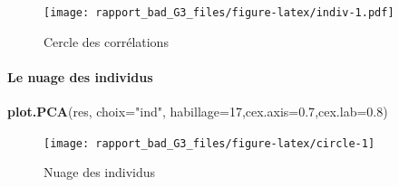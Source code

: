 \documentclass[
]{article}
\newenvironment{Shaded}{\begin{snugshade}}{\end{snugshade}}
\newcommand{\DataTypeTok}[1]{\textcolor[rgb]{0.13,0.29,0.53}{#1}}
\newcommand{\DecValTok}[1]{\textcolor[rgb]{0.00,0.00,0.81}{#1}}
\newcommand{\FloatTok}[1]{\textcolor[rgb]{0.00,0.00,0.81}{#1}}
\newcommand{\KeywordTok}[1]{\textcolor[rgb]{0.13,0.29,0.53}{\textbf{#1}}}
\newcommand{\NormalTok}[1]{#1}
\newcommand{\StringTok}[1]{\textcolor[rgb]{0.31,0.60,0.02}{#1}}
\begin{document}
\begin{figure}
\centering
\texttt{[image: rapport\_bad\_G3\_files/figure-latex/indiv-1.pdf]}
\caption{Cercle des corrélations}
\end{figure}

\hypertarget{le-nuage-des-individus}{%
\paragraph{\texorpdfstring{\textbf{Le nuage des
individus}}{Le nuage des individus}}\label{le-nuage-des-individus}}

\begin{Shaded}
\begin{Highlighting}[]
\KeywordTok{plot.PCA}\NormalTok{(res, }\DataTypeTok{choix=}\StringTok{"ind"}\NormalTok{, }\DataTypeTok{habillage=}\DecValTok{17}\NormalTok{,}\DataTypeTok{cex.axis=}\FloatTok{0.7}\NormalTok{,}\DataTypeTok{cex.lab=}\FloatTok{0.8}\NormalTok{)}
\end{Highlighting}
\end{Shaded}

\begin{figure}[h]

{\centering \texttt{[image: rapport\_bad\_G3\_files/figure-latex/circle-1]} 

}

\caption{Nuage des individus}\label{fig:circle}
\end{figure}
\end{document}
